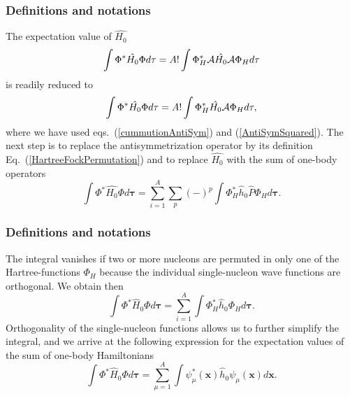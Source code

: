 \documentclass[compress]{beamer}
\begin{document}
\frame
{
  \frametitle{Definitions and notations}
\begin{small}
{\scriptsize
The expectation value of $\hat{H_0}$ 
\[
  \int \Phi^*\hat{H_0}\Phi d\mathbf{\tau} 
  = A! \int \Phi_H^*{\cal A}\hat{H_0}{\cal A}\Phi_H d\mathbf{\tau}
\]
is readily reduced to
\[
  \int \Phi^*\hat{H_0}\Phi d\mathbf{\tau} 
  = A! \int \Phi_H^*\hat{H_0}{\cal A}\Phi_H d\mathbf{\tau},
\]
where we have used eqs.~(\ref{cummutionAntiSym}) and
(\ref{AntiSymSquared}). The next step is to replace the antisymmetrization
operator by its definition Eq.~(\ref{HartreeFockPermutation}) and to
replace $\hat{H_0}$ with the sum of one-body operators
\[
  \int \Phi^*\hat{H_0}\Phi  d\mathbf{\tau}
  = \sum_{i=1}^A \sum_{p} (-)^p\int 
  \Phi_H^*\hat{h}_0\hat{P}\Phi_H d\mathbf{\tau}.
\]

}
\end{small}
}

\frame
{
  \frametitle{Definitions and notations}
\begin{small}
{\scriptsize
The integral vanishes if two or more nucleons are permuted in only one
of the Hartree-functions $\Phi_H$ because the individual single-nucleon wave functions are
orthogonal. We obtain then
\[
  \int \Phi^*\hat{H}_0\Phi  d\mathbf{\tau}= \sum_{i=1}^A \int \Phi_H^*\hat{h}_0\Phi_H  d\mathbf{\tau}.
\]
Orthogonality of the single-nucleon functions allows us to further simplify the integral, and we
arrive at the following expression for the expectation values of the
sum of one-body Hamiltonians 
\begin{equation}
  \int \Phi^*\hat{H}_0\Phi  d\mathbf{\tau}
  = \sum_{\mu=1}^A \int \psi_{\mu}^*(\mathbf{x})\hat{h}_0\psi_{\mu}(\mathbf{x})
  d\mathbf{x}.
  \label{H1Expectation}
\end{equation}

}
\end{small}
}
\end{document}
